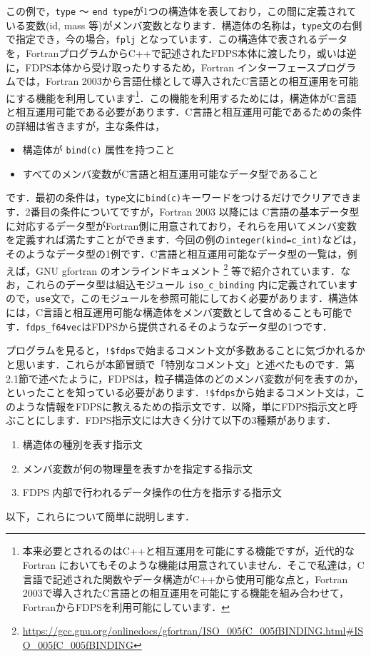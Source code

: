 \documentclass[twocolumn,10pt]{jarticle}
\begin{document}
この例で，\texttt{type} 〜 \texttt{end type}が1つの構造体を表しており，この間に定義されている変数(id, mass 等)がメンバ変数となります．構造体の名称は，\texttt{type}文の右側で指定でき，今の場合，\texttt{fplj} となっています．この構造体で表されるデータを，FortranプログラムからC++で記述されたFDPS本体に渡したり，或いは逆に，FDPS本体から受け取ったりするため，Fortran インターフェースプログラムでは，Fortran 2003から言語仕様として導入されたC言語との相互運用を可能にする機能を利用しています\footnote{本来必要とされるのはC++と相互運用を可能にする機能ですが，近代的な Fortran においてもそのような機能は用意されていません．そこで私達は，C言語で記述された関数やデータ構造がC++から使用可能な点と，Fortran 2003で導入されたC言語との相互運用を可能にする機能を組み合わせて，FortranからFDPSを利用可能にしています．}．この機能を利用するためには，構造体がC言語と相互運用可能である必要があります．C言語と相互運用可能であるための条件の詳細は省きますが，主な条件は，
\begin{itemize}
\item 構造体が \texttt{bind(c)} 属性を持つこと
\item すべてのメンバ変数がC言語と相互運用可能なデータ型であること
\end{itemize}
です．最初の条件は，\texttt{type}文に\texttt{bind(c)}キーワードをつけるだけでクリアできます．2番目の条件についてですが，Fortran 2003 以降には C言語の基本データ型に対応するデータ型がFortran側に用意されており，それらを用いてメンバ変数を定義すれば満たすことができます．今回の例の\texttt{integer(kind=c\_int)}などは，そのようなデータ型の1例です．C言語と相互運用可能なデータ型の一覧は，例えば，GNU gfortran のオンラインドキュメント
\footnote{\url{https://gcc.gnu.org/onlinedocs/gfortran/ISO_005fC_005fBINDING.html#ISO_005fC_005fBINDING}}
等で紹介されています．なお，これらのデータ型は組込モジュール \texttt{iso\_c\_binding} 内に定義されていますので，\texttt{use}文で，このモジュールを参照可能にしておく必要があります．構造体には，C言語と相互運用可能な構造体をメンバ変数として含めることも可能です．\texttt{fdps\_f64vec}はFDPSから提供されるそのようなデータ型の1つです．


プログラムを見ると，\texttt{!\$fdps}で始まるコメント文が多数あることに気づかれるかと思います．これらが本節冒頭で「特別なコメント文」と述べたものです．第2.1節で述べたように，FDPSは，粒子構造体のどのメンバ変数が何を表すのか，といったことを知っている必要があります．\texttt{!\$fdps}から始まるコメント文は，このような情報をFDPSに教えるための指示文です．以降，単にFDPS指示文と呼ぶことにします．FDPS指示文には大きく分けて以下の3種類があります．
\begin{enumerate}[label=(\alph*)]
\item 構造体の種別を表す指示文\label{enum:dir_for_str}
\item メンバ変数が何の物理量を表すかを指定する指示文\label{enum:dir_for_mbr}
\item FDPS 内部で行われるデータ操作の仕方を指示する指示文\label{enum:dir_for_meth}
\end{enumerate}
以下，これらについて簡単に説明します．
\end{document}

